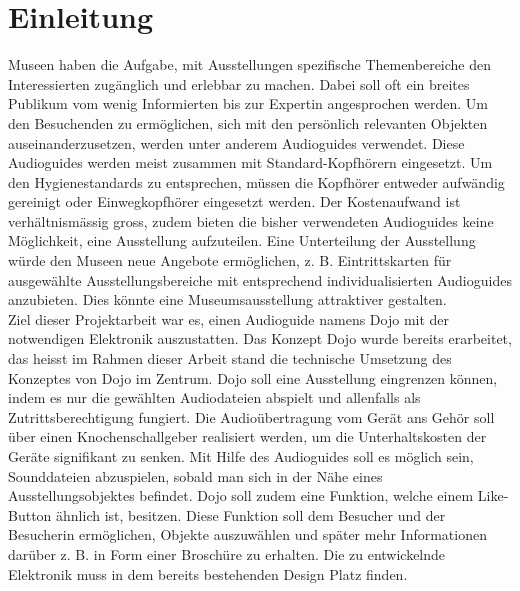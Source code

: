 \chapter{Einleitung}
\thispagestyle{fancy}  \setcounter{page}{1}
Museen haben die Aufgabe, mit Ausstellungen spezifische Themenbereiche den Interessierten zugänglich und erlebbar zu machen. Dabei soll oft ein breites Publikum vom wenig Informierten bis zur Expertin angesprochen werden. Um den Besuchenden zu ermöglichen, sich mit den persönlich relevanten Objekten auseinanderzusetzen, werden unter anderem Audioguides verwendet. Diese Audioguides werden meist zusammen mit Standard-Kopfhörern eingesetzt. Um den Hygienestandards zu entsprechen, müssen die Kopfhörer entweder aufwändig gereinigt oder Einwegkopfhörer eingesetzt werden. Der Kostenaufwand ist verhältnismässig gross, zudem bieten die bisher verwendeten Audioguides keine Möglichkeit, eine Ausstellung aufzuteilen. Eine Unterteilung der Ausstellung würde den Museen neue Angebote ermöglichen, z. B. Eintrittskarten für ausgewählte Ausstellungsbereiche mit entsprechend individualisierten Audioguides anzubieten. Dies könnte eine Museumsausstellung attraktiver gestalten. \\

Ziel dieser Projektarbeit war es, einen Audioguide namens Dojo mit der notwendigen Elektronik auszustatten. Das Konzept Dojo wurde bereits erarbeitet, das heisst im Rahmen dieser Arbeit stand die technische Umsetzung des Konzeptes von Dojo im Zentrum. Dojo soll eine Ausstellung eingrenzen können, indem es nur die gewählten Audiodateien abspielt und allenfalls als Zutrittsberechtigung fungiert.  Die Audioübertragung vom Gerät ans Gehör soll über einen Knochenschallgeber realisiert werden, um die Unterhaltskosten der Geräte signifikant zu senken. Mit Hilfe des Audioguides soll es möglich sein, Sounddateien abzuspielen, sobald man sich in der Nähe eines Ausstellungsobjektes befindet. Dojo soll zudem eine Funktion, welche einem Like-Button ähnlich ist, besitzen. Diese Funktion soll dem Besucher und der Besucherin ermöglichen, Objekte auszuwählen und später mehr Informationen darüber z. B. in Form einer Broschüre zu erhalten. Die zu entwickelnde Elektronik muss in dem bereits bestehenden Design Platz finden. \\

